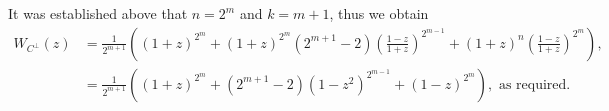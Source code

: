 It was established above that $n=2^m$ and $k=m+1$, thus we obtain
\begin{align*}
W_{C^\perp}(z)
&=\frac{1}{2^{m+1}} \left(\left(1+z\right)^{2^m} + \left(1+z\right)^{2^m}(2^{m+1} - 2)\left(\frac{1-z}{1+z}\right)^{2^{m-1}} + \left(1+z\right)^n\left(\frac{1-z}{1+z}\right)^{2^m}\right),\\
&=\frac{1}{2^{m+1}} \left(\left(1+z\right)^{2^m} + (2^{m+1} - 2)(1-z^2)^{2^{m-1}} + (1-z)^{2^m}\right), \text{ as required.}
\end{align*}
